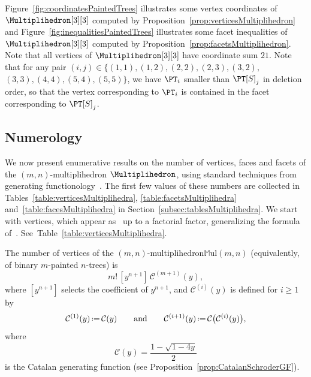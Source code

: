 \documentclass[AHL,Unicode,longabstracts,published]{cedram}
\newcommand{\eqdef}{\mbox{\,\raisebox{0.2ex}{\scriptsize\ensuremath{\mathrm:}}\ensuremath{=}\,}}
\newcommand{\OEIS}[1]{{\rm \href{http://oeis.org/#1}{\texttt{#1}}}}
\newcommand{\polytope}[1]{\mathds{#1}}
\newcommand{\CGF}{\mathcal{C}}
\begin{document}
\begin{exam}
Figure~\ref{fig:coordinatesPaintedTrees} illustrates some vertex coordinates of $\Multiplihedron[3][3]$ computed by Proposition~\ref{prop:verticesMultiplihedron} and Figure~\ref{fig:inequalitiesPaintedTrees} illustrates some facet inequalities of $\Multiplihedron[3][3]$ computed by Proposition~\ref{prop:facetsMultiplihedron}. Note that all vertices of $\Multiplihedron[3][3]$ have coordinate sum $21$. Note that for any pair $(i, j) \in \{(1, 1), (1, 2), (2, 2), (2, 3), (3, 2),$ $(3, 3), (4, 4), (5, 4), (5, 5)\}$, we have $\PT_i$ smaller than $\PT[S]_j$ in deletion order, so that the vertex corresponding to $\PT_i$ is contained in the facet corresponding to $\PT[S]_j$.
\end{exam}

\subsection{Numerology}\label{subsec:numerologyMultiplihedra}

We now present enumerative results on the number of vertices, faces and facets of the $(m,n)$-multiplihedron $\Multiplihedron$, using standard techniques from generating functionology~\cite{FlajoletSedgewick}. The first few values of these numbers are collected in Tables~\ref{table:verticesMultiplihedra}, \ref{table:facetsMultiplihedra} and~\ref{table:facesMultiplihedra} in Section~\ref{subsec:tablesMultiplihedra}. We start with vertices, which appear as~\cite[\OEIS{A158825}]{OEIS} up to a factorial factor, generalizing the formula of~\cite[Thm.~3.1]{Forcey-multiplihedra}. See~Table~\ref{table:verticesMultiplihedra}.

\begin{prop}\label{prop:numberVerticesMultiplihedra}
The number of vertices of the $(m,n)$-multiplihedron\linebreak $\polytope{M}\mathrm{ul}(m, n)$
(equivalently, of binary $m$-painted $n$-trees) is
\[
m! \, \left[y^{n+1}\right] \, \CGF^{(m+1)}(y),
\]
where $[y^{n+1}]$ selects the coefficient of $y^{n+1}$, and $\CGF^{(i)}(y)$ is defined for $i \ge 1$ by
\[
\CGF^{(1)}(y) \eqdef \CGF(y)
\qquad\text{and}\qquad
\CGF^{(i+1)}(y) \eqdef \CGF \big(\CGF^{(i)}(y) \big),
\]
where
\[
\CGF(y) = \frac{1-\sqrt{1-4y}}{2}
\]
is the Catalan generating function (see Proposition~\ref{prop:CatalanSchroderGF}).
\end{prop}
\end{document}
